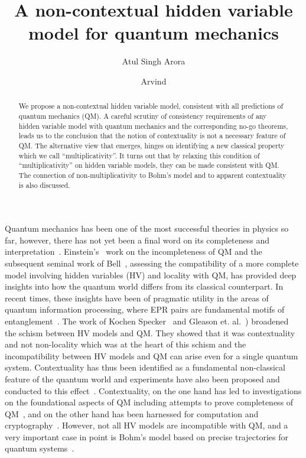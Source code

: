 \documentclass[british,aps,prl,superscriptaddress,nofootinbib,times,reprint]{revtex4-1}
\theoremstyle{plain}
\theoremstyle{plain}
\theoremstyle{definition}
\theoremstyle{remark}
\theoremstyle{remark}
\theoremstyle{remark}
\theoremstyle{plain}
\theoremstyle{plain}
\theoremstyle{plain}
\theoremstyle{definition}
\theoremstyle{definition}
\begin{document}
\title{A non-contextual hidden variable model for quantum mechanics}
\author{Atul Singh Arora}
%
\author{Arvind}
%
\begin{abstract}
We propose a non-contextual hidden variable model,
consistent with all predictions of quantum
mechanics (QM).  A careful scrutiny of consistency
requirements of any hidden variable model with
quantum mechanics and the corresponding no-go
theorems, leads us to the conclusion that the
notion of contextuality is not a necessary feature
of QM.  The alternative view that emerges, hinges
on identifying a new classical property which we
call ``multiplicativity''.  It turns out that by
relaxing this condition of ``multiplicativity'' on
hidden variable models, they can be made
consistent with QM.  The connection of
non-multiplicativity to Bohm's model and to
apparent contextuality is also discussed.
\end{abstract}
\pacs{}
\maketitle
Quantum mechanics has been one of the most
successful theories in physics so far, however,
there has not yet been a final word on its
completeness and interpretation~\cite{BellSpkblUnspkbl}.
Einstein's~\cite{EinsteinEPR} work on the
incompleteness of QM and the subsequent seminal
work of Bell~\cite{BellSpkblUnspkbl}, assessing the
compatibility of a more complete model involving
hidden variables (HV) and locality with QM, has
provided deep insights into  how the quantum world
differs from its classical counterpart.  In recent
times, these insights have been of pragmatic
utility in the areas of quantum information
processing, where EPR pairs are fundamental motifs
of entanglement~\cite{Ekert,PironioRndmnssCrtfcn,NielsenChuang}.
The work of  Kochen Specker~\cite{KochenSpecker}
and Gleason et.
al.~\cite{Gleason,BellOnHiddenVariables,Peres,Mermin})
broadened the schism between  HV models and QM.
They showed that it was contextuality and not
non-locality which was at the heart of this schism
and the incompatibility between HV models and QM
can arise even for a single quantum system.
Contextuality has thus been identified as a
fundamental non-classical feature of the quantum
world and experiments have also been proposed and
conducted to this effect~\cite{SimonContExpProp,
HuangContExp}.
Contextuality, on the one hand has led to
investigations on the foundational aspects of
QM including attempts to prove completeness of QM~\cite{PawelCntxClsscl,CabelloMmryQM}, and on the other
hand has been harnessed for computation and
cryptography~\cite{HowardCntxCmptn,CabelloCntxScrt}.
However, not all HV
models are incompatible with QM, and a very
important case in point is  Bohm's model based on
precise trajectories for quantum
systems~\cite{Bohm1,Bohm2}. 
\end{document}
